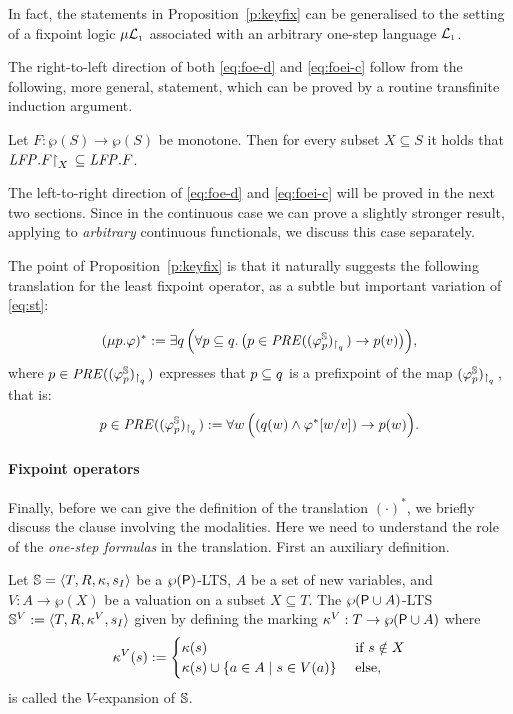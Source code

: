 \begin{remark}
In fact, the statements in Proposition~\ref{p:keyfix} can be generalised to the
setting of a fixpoint logic $\mu\mathcal{L}_{\scriptscriptstyle 1}$ associated with an arbitrary one-step 
language $\mathcal{L}_{\scriptscriptstyle 1}$.
\end{remark}

The right-to-left direction of both \eqref{eq:foe-d} and \eqref{eq:foei-c} follow
from the following, more general, statement, which can be proved by a routine 
transfinite induction argument.

\begin{proposition}
\label{p:rstfix}
Let $F:  \wp(S)\to \wp(S)$ be monotone.
Then for every subset $X \subseteq S$ it holds that $\mathit{LFP}. F{\upharpoonright}_{X}\,\subseteq 
\mathit{LFP}.F$.
\end{proposition}

The left-to-right direction of \eqref{eq:foe-d} and \eqref{eq:foei-c} 
will be proved in the next two sections.
Since in the continuous case we can prove a slightly stronger result, applying
to \emph{arbitrary} continuous functionals, we discuss this case separately.

\newcommand{\PRE}{\mathit{PRE}}
The point of Proposition~\ref{p:keyfix} is that it naturally suggests the
following translation for the least fixpoint operator, as a subtle but important 
variation of \eqref{eq:st}:

\begin{equation}
\label{eq:trlmu}
(\mu p. \varphi)^{*} \df 
   \exists q\,\Big(\forall  p \sse q.\,
      \big(p \in \PRE((\varphi^{\model}_{p})_{\rst{q}}) \to p(v)\big)\Big),
\end{equation}
where $p \in \PRE((\varphi^{\model}_{p})_{\rst{q}})$ expresses that $p \subseteq q$ 
is a prefixpoint of the map $(\varphi^{\mathbb{S}}_{p})_{{\upharpoonright}_{q}\,}$, that is:
\[
p  \in \PRE((\varphi^{\model}_{p})_{\rst{q}}) \df
\forall w\, \Big(
( q(w) \land \varphi^{*}[w/v]) \to p(w)
\Big).
\]

\paragraph{Fixpoint operators}
Finally, before we can give the definition of the translation $(\cdot)^{*}$, we
briefly discuss the clause involving the modalities.
Here we need to understand the role of the \emph{one-step formulas} in the 
translation.
First an auxiliary definition.

\begin{definition}\label{def:exp}
Let $\mathbb{S} = \langle{T,R,\kappa, s_I}\rangle$ be a $\wp{(\mathsf{P})}$-LTS, $A$ be a set of new variables, and $V: A \to
\wp(X)$ be a valuation on a subset $X\subseteq T$. The $\wp{(\mathsf{P}\cup A)}$-LTS $\mathbb{S}^{V}:=\langle{T,R,\kappa^V, s_I}\rangle$ given by defining the marking $\kappa^V: T \to \wp{(\mathsf{P}\cup A)}$ where
\[\tscolors^V(s):= 
\begin{cases} \tscolors(s) & \text{ if } s \notin X \\
\tscolors(s) \cup \{ a \in A \mid s \in V(a)\}& \text{ else,}
\end{cases}\]
is called the $V$-expansion of $\mathbb{S}$.
\end{definition}

